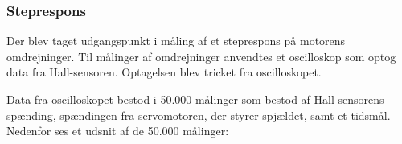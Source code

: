 



\subsubsection{Steprespons}
\label{sec:steprespons}

Der blev taget udgangspunkt i måling af et steprespons på motorens omdrejninger. Til målinger af omdrejninger anvendtes et oscilloskop som optog data fra Hall-sensoren. Optagelsen blev tricket fra oscilloskopet.%

Data fra oscilloskopet bestod i 50.000 målinger som bestod af Hall-sensorens spænding, spændingen fra servomotoren, der styrer spjældet, samt et tidsmål. Nedenfor ses et udsnit af de 50.000 målinger:

